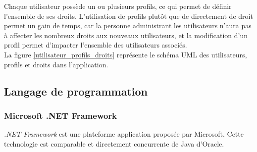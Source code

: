 Chaque utilisateur possède un ou plusieurs profils, ce qui permet de définir l'ensemble de ses droits. L'utilisation de profils plutôt que de directement de droit permet un gain de temps, car la personne administrant les utilisateurs n'aura pas à affecter les nombreux droits aux nouveaux utilisateurs, et la modification d'un profil permet d'impacter l'ensemble des utilisateurs associés.
\\

La figure \ref{utilisateur_profils_droits} représente le schéma UML des utilisateurs, profils et droits dans l'application.


\subsection{Langage de programmation}


\subsubsection{Microsoft .NET Framework}

\textit{.NET Framework} est une plateforme application proposée par Microsoft. Cette technologie est comparable et directement concurrente de Java d'Oracle.

